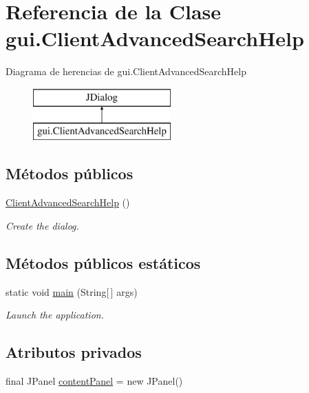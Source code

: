 \hypertarget{classgui_1_1_client_advanced_search_help}{}\section{Referencia de la Clase gui.\+Client\+Advanced\+Search\+Help}
\label{classgui_1_1_client_advanced_search_help}
Diagrama de herencias de gui.\+Client\+Advanced\+Search\+Help\begin{figure}[H]
\begin{center}
\leavevmode
\includegraphics[height=2.000000cm]{classgui_1_1_client_advanced_search_help}
\end{center}
\end{figure}
\subsection*{Métodos públicos}
\begin{DoxyCompactItemize}
\item 
\mbox{\hyperlink{classgui_1_1_client_advanced_search_help_afec1b2d3d9d873fbb409edab3aef1742}{Client\+Advanced\+Search\+Help}} ()
\begin{DoxyCompactList}\small\item\em Create the dialog. \end{DoxyCompactList}\end{DoxyCompactItemize}
\subsection*{Métodos públicos estáticos}
\begin{DoxyCompactItemize}
\item 
static void \mbox{\hyperlink{classgui_1_1_client_advanced_search_help_aed5a6c114fbe236919aa65e64491ac2f}{main}} (String\mbox{[}$\,$\mbox{]} args)
\begin{DoxyCompactList}\small\item\em Launch the application. \end{DoxyCompactList}\end{DoxyCompactItemize}
\subsection*{Atributos privados}
\begin{DoxyCompactItemize}
\item 
final J\+Panel \mbox{\hyperlink{classgui_1_1_client_advanced_search_help_aa267d5420c219823e71af0e377df9393}{content\+Panel}} = new J\+Panel()
\end{DoxyCompactItemize}


